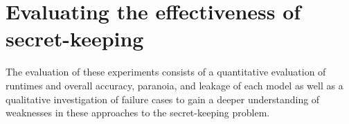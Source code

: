 \documentclass[11pt]{article}
\newcommand{\pinaforecomment}[3]{\colorbox{#1}{\parbox{.8\linewidth}{#2: #3}}}
\newcommand{\pinaforecomment}[3]{}
\newcommand{\jbgcomment}[1]{\pinaforecomment{red}{JBG}{#1}}
\begin{document}
\section{Evaluating the effectiveness of secret-keeping}\label{evaluation}



The evaluation of these experiments consists of a quantitative evaluation of runtimes and overall accuracy, paranoia, and leakage of each model as well as a qualitative investigation of failure cases to gain a deeper understanding of weaknesses in these approaches to the secret-keeping problem. 


\end{document}
